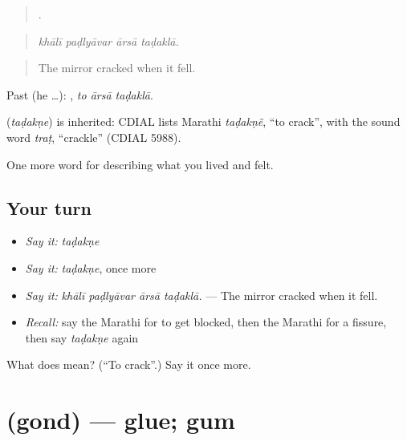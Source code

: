 \begin{quote}
   .
\end{quote}

\begin{quote}
\emph{khālī paḍlyāvar ārsā taḍaklā.}
\end{quote}

\begin{quote}
The mirror cracked when it fell.
\end{quote}

Past (he …):   , \emph{to ārsā taḍaklā}.

\begin{cousinweb}
\textbf{} (\emph{taḍakṇe}) is inherited: CDIAL lists Marathi \emph{taḍakṇẽ}, \textquotedblleft{}to crack\textquotedblright{}, with the sound word \emph{traṭ}, \textquotedblleft{}crackle\textquotedblright{} (CDIAL 5988).
\end{cousinweb}

\begin{grammarlens}[title={What you've built}]
One more word for describing what you lived and felt.
\end{grammarlens}

\subsection*{Your turn}
\begin{itemize}
\raggedright
  \item \emph{Say it:} \emph{taḍakṇe}
  \item \emph{Say it:} \emph{taḍakṇe}, once more
  \item \emph{Say it:} \emph{khālī paḍlyāvar ārsā taḍaklā.} — The mirror cracked when it fell.
  \item \emph{Recall:} say the Marathi for to get blocked, then the Marathi for a fissure, then say \emph{taḍakṇe} again
\end{itemize}

\begin{tcolorbox}[breakable,colback=teal!4,colframe=teal!35!black,title={Before you move on}]
What does  mean? (\textquotedblleft{}To crack\textquotedblright{}.) Say it once more.
\end{tcolorbox}
\section[\texorpdfstring{\mr{गोंद} (gond)}{गोंद (gond)}]{ (gond) — glue; gum}

